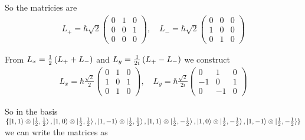 \documentclass[a4paper,german,12pt,smallheadings]{scrartcl}
\begin{document}
\begin{enumerate}[a)]
    So the matricies are
    \begin{align*}
      L_+ = \hbar \sqrt{2} \begin{pmatrix}
        0 & 1 & 0 \\
        0 & 0 & 1 \\
        0 & 0 & 0 
      \end{pmatrix}, \quad
      L_- = \hbar \sqrt{2} \begin{pmatrix}
        0 & 0 & 0 \\
        1 & 0 & 0 \\
        0 & 1 & 0 
      \end{pmatrix}
    \end{align*}

    From $L_x = \frac{1}{2} \del{L_+ + L_-}$ and $L_y = \frac{1}{2i} \del{L_+ -
    L_-}$ we construct
    \begin{align*}
      L_x = \hbar \frac{\sqrt{2}}{2} \begin{pmatrix}
        0 & 1 & 0 \\
        1 & 0 & 1 \\
        0 & 1 & 0
      \end{pmatrix}, \quad
      L_y = \hbar \frac{\sqrt{2}}{2i} \begin{pmatrix}
        0 & 1 & 0 \\
        -1 & 0 & 1 \\
        0 & -1 & 0
      \end{pmatrix}
    \end{align*}

    So in the basis $
    \{
      \ket{1,1} \otimes \ket{\tfrac{1}{2}, \tfrac{1}{2}},
      \ket{1,0} \otimes \ket{\tfrac{1}{2}, \tfrac{1}{2}},
      \ket{1,-1} \otimes \ket{\tfrac{1}{2}, \tfrac{1}{2}},
      \ket{1,1} \otimes \ket{\tfrac{1}{2}, -\tfrac{1}{2}},
      \ket{1,0} \otimes \ket{\tfrac{1}{2}, -\tfrac{1}{2}},
      \ket{1,-1} \otimes \ket{\tfrac{1}{2}, -\tfrac{1}{2}}
    \}
    $ we can write the matrices as


\end{enumerate}
\end{document}
